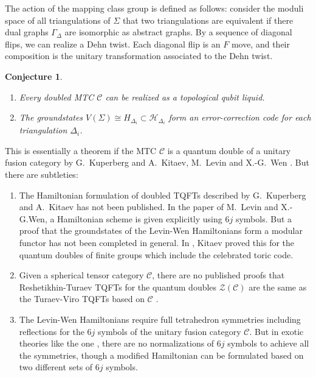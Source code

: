\documentclass[12pt,psamsfonts]{amsart}
\newcommand{\mC}{\mathcal{C}}
\newcommand{\mH}{\mathcal{H}}
\newcommand{\mZ}{\mathcal{Z}}
\numberwithin{equation}{section}
\newtheorem{conj}[theorem]{Conjecture}
\theoremstyle{definition}
\begin{document}
The action of the mapping class group is defined as follows:
consider the moduli space of all triangulations of $\Sigma$ that
two triangulations are equivalent if there dual graphs
$\Gamma_{\Delta}$ are isomorphic as abstract graphs. By a sequence
of diagonal flips, we can realize a Dehn twist. Each diagonal flip
is an $F$ move,  and their composition is the unitary
transformation associated to the Dehn twist.

\begin{conj}

\begin{enumerate}

\item Every doubled MTC $\mC$ can be realized as a topological qubit liquid.

\item The groundstates $V(\Sigma)\cong H_{\Delta_i}\subset
\mH_{\Delta_i}$ form an error-correction code for each
triangulation $\Delta_i$.

\end{enumerate}

 \end{conj}


\iffalse
This is essentially a theorem if the MTC $\mC$ is a quantum double
of a unitary fusion category by G.~Kuperberg and A.~Kitaev,
M.~Levin and X.-G.~Wen \cite{LW}. But there are subtleties:

\begin{enumerate}

\item The Hamiltonian formulation of doubled TQFTs described by
G.~Kuperberg and A.~Kitaev has not been published. In the paper of
M.~Levin and X.-G.Wen, a Hamiltonian scheme is given explicitly
using $6j$ symbols. But a proof that the groundstates of the
Levin-Wen Hamiltonians form a modular functor has not been
completed in general.   In \cite{Kitaev1}, Kitaev proved this for
the quantum doubles of finite groups which include the celebrated
toric code.

\item Given a spherical tensor category $\mC$, there are no
published proofs that Reshetikhin-Turaev TQFTs for the quantum
doubles $\mZ(\mC)$ are the same as the Turaev-Viro TQFTs based on
$\mC$ \cite{MugerII}\cite{TV}.

\item The Levin-Wen Hamiltonians require full tetrahedron
symmetries including reflections for the $6j$ symbols of the
unitary fusion category $\mC$.  But in exotic theories like the
one \cite{HH}, there are no normalizations of $6j$ symbols to
achieve all the symmetries, though a modified Hamiltonian can be
formulated based on two different sets of $6j$ symbols.



\end{enumerate}
\end{document}
